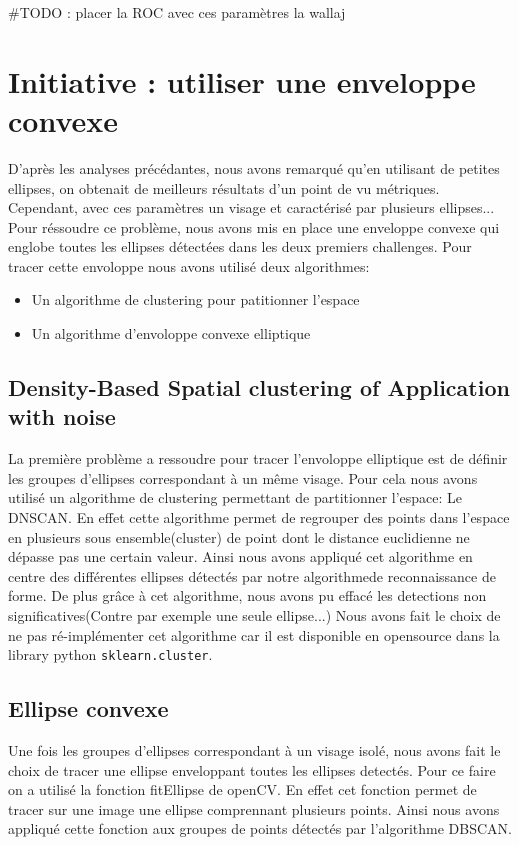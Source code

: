 \documentclass[a4paper,12pt, openany]{book}
\theoremstyle{break}
\begin{document}
\#TODO : placer la ROC avec ces paramètres la wallaj

\section{Initiative : utiliser une enveloppe convexe}
D'après les analyses précédantes, nous avons remarqué qu'en utilisant de petites ellipses, on obtenait de meilleurs résultats d'un point de vu métriques. Cependant, avec ces paramètres un visage et caractérisé par plusieurs ellipses... Pour réssoudre ce problème, nous avons mis en place une enveloppe convexe qui englobe toutes les ellipses détectées dans les deux premiers challenges.
Pour tracer cette envoloppe nous avons utilisé deux algorithmes:

\begin{itemize}
  \item Un algorithme de clustering pour patitionner l'espace
  \item Un algorithme d'envoloppe convexe elliptique
\end{itemize}

\subsection{Density-Based Spatial clustering of Application with noise}
La première problème a ressoudre pour tracer l'envoloppe elliptique est de définir les groupes d'ellipses correspondant à un même visage. Pour cela nous avons utilisé un algorithme de clustering permettant de partitionner l'espace: Le DNSCAN. En effet cette algorithme permet de regrouper des points dans l'espace en plusieurs sous ensemble(cluster) de point dont le distance euclidienne ne dépasse pas une certain valeur. Ainsi nous avons appliqué cet algorithme en centre des différentes ellipses détectés par notre algorithmede reconnaissance de forme.
De plus grâce à cet algorithme, nous avons pu effacé les detections non significatives(Contre par exemple une seule ellipse...)
Nous avons fait le choix de ne pas ré-implémenter cet algorithme car il est disponible en opensource dans la library python \texttt{sklearn.cluster}.

\subsection{Ellipse convexe}
 Une fois les groupes d'ellipses correspondant à un visage isolé, nous avons fait le choix de tracer une ellipse enveloppant toutes les ellipses detectés. Pour ce faire on a utilisé la fonction fitEllipse de openCV. En effet cet fonction permet de tracer sur une image une ellipse comprennant plusieurs points. Ainsi nous avons appliqué cette fonction aux groupes de points détectés par l'algorithme DBSCAN.
\end{document}
